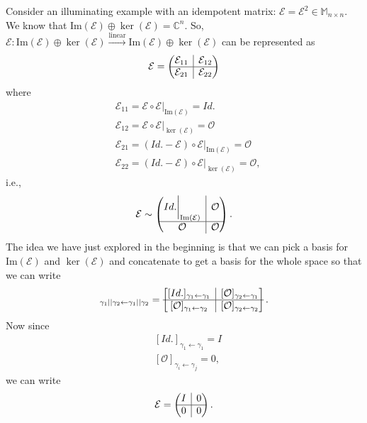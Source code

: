 \documentclass{book}
\theoremstyle{definition}
\newcommand{\E}{\mathcal{E}}
\newcommand{\ima}{\text{Im}}
\newcommand{\lin}{\overset{\text{linear}}{\longrightarrow}}
\newcommand{\rvline}{\hspace*{-\arraycolsep}\vline\hspace*{-\arraycolsep}}
\begin{document}
Consider an illuminating example with an idempotent matrix: $\E = \E^2 \in \mathbb{M}_{n\times n}$. We know that $\ima(\E) \oplus \ker(\E) = \mathbb{C}^n$. So, $\E : \ima(\E) \oplus \ker(\E) \lin \ima(\E) \oplus \ker(\E)$ can be represented as
\begin{align*}
\E =
\begin{pmatrix}
\E_{11} & \rvline & \E_{12}\\
\hline
\E_{21} & \rvline & \E_{22}
\end{pmatrix}
\end{align*} 
where 
\begin{align*}
&\E_{11} = \E \circ \E\bigg\vert_{\ima(\E)} = Id.\\
&\E_{12} = \E \circ \E\bigg\vert_{\ker(\E)} = \mathcal{O}\\
&\E_{21} = (Id. - \E) \circ \E \bigg\vert_{\ima(\E)} = \mathcal{O}\\
&\E_{22} = (Id. - \E) \circ \E \bigg\vert_{\ker(\E)} = \mathcal{O},
\end{align*}
i.e.,
\begin{align*}
\E \sim \begin{pmatrix}
Id.\bigg\vert_{\ima(\E)} & \rvline & \mathcal{O}\\
\hline
\mathcal{O} & \rvline & \mathcal{O}
\end{pmatrix}.
\end{align*}
The idea we have just explored in the beginning is that we can pick a basis for $\ima(\E)$ and $\ker(\E)$ and concatenate to get a basis for the whole space so that we can write
\begin{align*}
[\E]_{\gamma_1||\gamma_2 \leftarrow \gamma_1||\gamma_2} =
\begin{bmatrix}
[Id.]_{\gamma_1\leftarrow \gamma_1} & \rvline & [\mathcal{O}]_{\gamma_2 \leftarrow \gamma_1}\\
\hline
[\mathcal{O}]_{\gamma_1 \leftarrow \gamma_2} & \rvline & [\mathcal{O}]_{\gamma_2 \leftarrow \gamma_2}
\end{bmatrix}.
\end{align*}
Now since
\begin{align*}
&[Id.]_{\gamma_1\leftarrow \gamma_1} = I\\
&[\mathcal{O}]_{\gamma_i \leftarrow \gamma_j} = 0,
\end{align*}
we can write
\begin{align*}
\E = 
\begin{pmatrix}
I & \rvline & 0\\
\hline
0 & \rvline & 0
\end{pmatrix}.
\end{align*}
\end{document}
